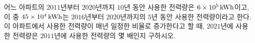 어느 아파트의 $2011$년부터 $2020$년까지 $10$년 동안 사용한 전력량은 $6\times 10^5\mkern3mu \mathrm{kWh}$이고, 이 중 $45\times 10^4\mkern3mu \mathrm{kWh}$는 $2016$년부터 $2020$년까지의 $5$년 동안 사용한 전력량이라고 한다. 이 아파트에서 사용한 전력량이 매년 일정한 비율로 증가한다고 할 때, $2021$년에 사용한 전력량은 $2011$년에 사용한 전력량의 몇 배인지 구하시오.
